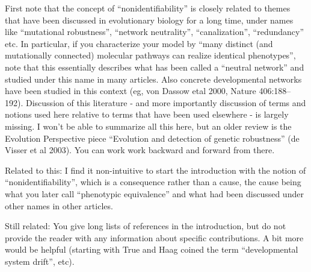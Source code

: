 \begin{point}{}
    First note that the concept of ``nonidentifiability'' is closely related to
themes that have been discussed in evolutionary biology for a long time, under
names like ``mutational robustness'', ``network neutrality'', ``canalization'',
``redundancy'' etc. In particular, if you characterize your model by ``many
distinct (and mutationally connected) molecular pathways can realize identical
phenotypes'', note that this essentially describes what has been called a
``neutral network'' and studied under this name in many articles. Also concrete
developmental networks have been studied in this context (eg, von Dassow etal
2000, Nature 406:188–192). Discussion of this literature - and more importantly
discussion of terms and notions used here relative to terms that have been used
elsewhere - is largely missing. I won't be able to summarize all this here, but
an older review is the Evolution Perspective piece ``Evolution and detection of
genetic robustness'' (de Visser et al 2003). You can work work backward and
forward from there.  
\end{point}


\begin{point}{}
    Related to this: I find it non-intuitive to start the introduction with the
notion of ``nonidentifiability'', which is a consequence rather than a cause, the
cause being what you later call ``phenotypic equivalence'' and what had been
discussed under other names in other articles.
\end{point}


\begin{point}{}
    Still related: You give long lists of references in the introduction, but do
not provide the reader with any information about specific contributions. A bit
more would be helpful (starting with True and Haag coined the term
``developmental system drift'', etc).
\end{point}


